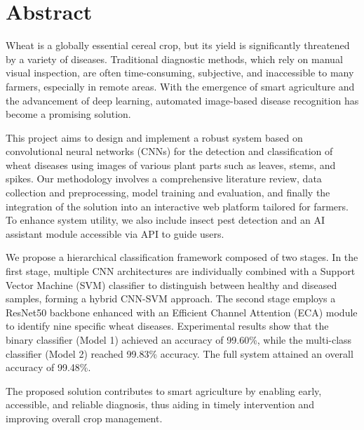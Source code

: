 \cleardoublepage
{}
\setcounter{page}{2}
\chapter*{{\Huge\bfseries Abstract}}   %
\thispagestyle{noheader}

\vspace{0.5cm}


Wheat is a globally essential cereal crop, but its yield is significantly threatened by a variety of diseases. Traditional diagnostic methods, which rely on manual visual inspection, are often time-consuming, subjective, and inaccessible to many farmers, especially in remote areas. With the emergence of smart agriculture and the advancement of deep learning, automated image-based disease recognition has become a promising solution.

This project aims to design and implement a robust system based on convolutional neural networks (CNNs) for the detection and classification of wheat diseases using images of various plant parts such as leaves, stems, and spikes. Our methodology involves a comprehensive literature review, data collection and preprocessing, model training and evaluation, and finally the integration of the solution into an interactive web platform tailored for farmers. To enhance system utility, we also include insect pest detection and an AI assistant module accessible via API to guide users.

We propose a hierarchical classification framework composed of two stages. In the first stage, multiple CNN architectures are individually combined with a Support Vector Machine (SVM) classifier to distinguish between healthy and diseased samples, forming a hybrid CNN-SVM approach. The second stage employs a ResNet50 backbone enhanced with an Efficient Channel Attention (ECA) module to identify nine specific wheat diseases. Experimental results show that the binary classifier (Model 1) achieved an accuracy of 99.60\%, while the multi-class classifier (Model 2) reached 99.83\% accuracy. The full system attained an overall accuracy of 99.48\%.

The proposed solution contributes to smart agriculture by enabling early, accessible, and reliable diagnosis, thus aiding in timely intervention and improving overall crop management.


